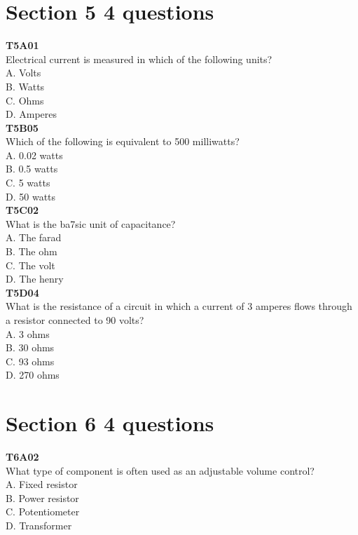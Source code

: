 \documentclass[12pt,letterpaper,twocolumn]{report}
\begin{document}
\section{Section 5 4 questions}

\textbf{T5A01}\\
Electrical current is measured in which of the following units?\\
A. Volts\\
B. Watts\\
C. Ohms\\
D. Amperes\\

\textbf{T5B05}\\
Which of the following is equivalent to 500 milliwatts?\\
A. 0.02 watts\\
B. 0.5 watts\\
C. 5 watts\\
D. 50 watts\\

\textbf{T5C02}\\
What is the ba7sic unit of capacitance?\\
A. The farad\\
B. The ohm\\
C. The volt\\
D. The henry\\

\textbf{T5D04}\\
What is the resistance of a circuit in which a current of 3 amperes flows through a resistor connected to 90 volts?\\
A. 3 ohms\\
B. 30 ohms\\
C. 93 ohms\\
D. 270 ohms\\

\section{Section 6 4 questions}

\textbf{T6A02}\\
What type of component is often used as an adjustable volume control?\\
A. Fixed resistor\\
B. Power resistor\\
C. Potentiometer\\
D. Transformer\\
\end{document}
